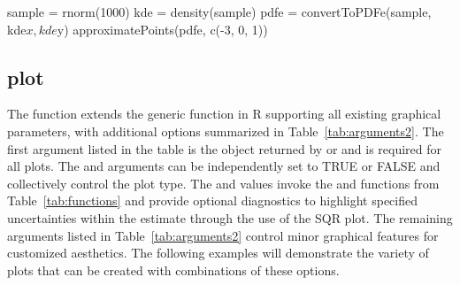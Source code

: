 \begin{example}
    sample = rnorm(1000)
    kde = density(sample)
    pdfe = convertToPDFe(sample, kde$x, kde$y)
    approximatePoints(pdfe, c(-3, 0, 1))
\end{example}

\subsection{plot} \label{plotfunction}

The  function extends the generic  function in R supporting all existing graphical parameters, with additional options summarized in Table~\ref{tab:arguments2}. The first argument listed in the table is the  object returned by  or  and is required for all plots. The  and  arguments can be independently set to TRUE or FALSE and collectively control the plot type. The  and  values invoke the  and  functions from Table~\ref{tab:functions} and provide optional diagnostics to highlight specified uncertainties within the estimate through the use of the SQR plot. The remaining arguments listed in Table~\ref{tab:arguments2} control minor graphical features for  customized aesthetics.  The following examples will demonstrate the variety of plots that can be created with combinations of these options.


